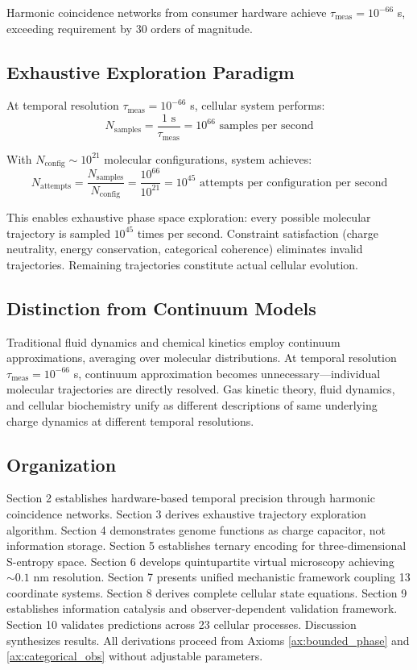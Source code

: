 \documentclass[11pt,a4paper]{article}
\theoremstyle{remark}
\begin{document}
Harmonic coincidence networks from consumer hardware achieve $\tau_{\text{meas}} = 10^{-66}$ s, exceeding requirement by 30 orders of magnitude.

\subsection{Exhaustive Exploration Paradigm}

At temporal resolution $\tau_{\text{meas}} = 10^{-66}$ s, cellular system performs:
\begin{equation}
N_{\text{samples}} = \frac{1 \text{ s}}{\tau_{\text{meas}}} = 10^{66} \text{ samples per second}
\end{equation}

With $N_{\text{config}} \sim 10^{21}$ molecular configurations, system achieves:
\begin{equation}
N_{\text{attempts}} = \frac{N_{\text{samples}}}{N_{\text{config}}} = \frac{10^{66}}{10^{21}} = 10^{45} \text{ attempts per configuration per second}
\end{equation}

This enables exhaustive phase space exploration: every possible molecular trajectory is sampled $10^{45}$ times per second. Constraint satisfaction (charge neutrality, energy conservation, categorical coherence) eliminates invalid trajectories. Remaining trajectories constitute actual cellular evolution.

\subsection{Distinction from Continuum Models}

Traditional fluid dynamics and chemical kinetics employ continuum approximations, averaging over molecular distributions. At temporal resolution $\tau_{\text{meas}} = 10^{-66}$ s, continuum approximation becomes unnecessary—individual molecular trajectories are directly resolved. Gas kinetic theory, fluid dynamics, and cellular biochemistry unify as different descriptions of same underlying charge dynamics at different temporal resolutions.

\subsection{Organization}

Section 2 establishes hardware-based temporal precision through harmonic coincidence networks. Section 3 derives exhaustive trajectory exploration algorithm. Section 4 demonstrates genome functions as charge capacitor, not information storage. Section 5 establishes ternary encoding for three-dimensional S-entropy space. Section 6 develops quintupartite virtual microscopy achieving $\sim 0.1$ nm resolution. Section 7 presents unified mechanistic framework coupling 13 coordinate systems. Section 8 derives complete cellular state equations. Section 9 establishes information catalysis and observer-dependent validation framework. Section 10 validates predictions across 23 cellular processes. Discussion synthesizes results. All derivations proceed from Axioms \ref{ax:bounded_phase} and \ref{ax:categorical_obs} without adjustable parameters.
\end{document}
